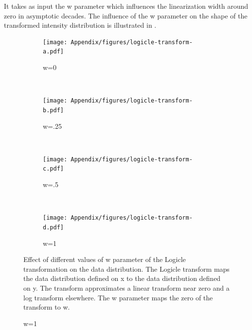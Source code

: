 It takes as input the w parameter which influences the linearization width around zero in asymptotic decades.
The influence of the w parameter on the shape of the transformed intensity distribution is illustrated in .
\begin{figure}[h]
\centering
\begin{subfigure}[b]{.4\textwidth}
    \centering
    \texttt{[image: Appendix/figures/logicle-transform-a.pdf]}
    \caption{w=0}
\end{subfigure}
~
\begin{subfigure}[b]{.4\textwidth}
    \centering
    \texttt{[image: Appendix/figures/logicle-transform-b.pdf]}
    \caption{w=.25}
\end{subfigure}
~
\begin{subfigure}[b]{.4\textwidth}
    \centering
    \texttt{[image: Appendix/figures/logicle-transform-c.pdf]}
    \caption{w=.5}
\end{subfigure}
~
\begin{subfigure}[b]{.4\textwidth}
    \centering
    \texttt{[image: Appendix/figures/logicle-transform-d.pdf]}
    \caption{w=1}
\end{subfigure}
{Effect of different values of w parameter of the Logicle transformation on the data distribution.}
{
  The Logicle transform maps the data distribution defined on x to the data distribution defined on y.
  The transform approximates a linear transform near zero and a log transform elsewhere.
  The w parameter maps the zero of the transform to w.
}
\end{figure} 
